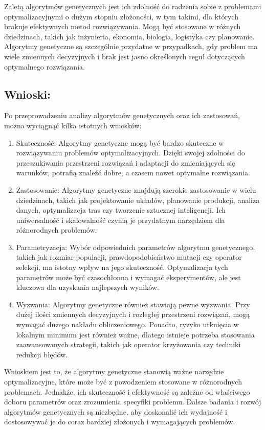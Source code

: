 \documentclass[11pt]{article}
\begin{document}
Zaletą algorytmów genetycznych jest ich zdolność do radzenia sobie z
problemami optymalizacyjnymi o dużym stopniu złożoności, w tym takimi,
dla których brakuje efektywnych metod rozwiązywania. Mogą być stosowane
w różnych dziedzinach, takich jak inżynieria, ekonomia, biologia,
logistyka czy planowanie. Algorytmy genetyczne są szczególnie przydatne
w przypadkach, gdy problem ma wiele zmiennych decyzyjnych i brak jest
jasno określonych reguł dotyczących optymalnego rozwiązania.

\hypertarget{wnioski}{%
\subsection{Wnioski:}\label{wnioski}}

Po przeprowadzeniu analizy algorytmów genetycznych oraz ich zastosowań,
można wyciągnąć kilka istotnych wniosków:

\begin{enumerate}
\def\labelenumi{\arabic{enumi}.}
\item
  Skuteczność: Algorytmy genetyczne mogą być bardzo skuteczne w
  rozwiązywaniu problemów optymalizacyjnych. Dzięki swojej zdolności do
  przeszukiwania przestrzeni rozwiązań i adaptacji do zmieniających się
  warunków, potrafią znaleźć dobre, a czasem nawet optymalne
  rozwiązania.
\item
  Zastosowanie: Algorytmy genetyczne znajdują szerokie zastosowanie w
  wielu dziedzinach, takich jak projektowanie układów, planowanie
  produkcji, analiza danych, optymalizacja tras czy tworzenie sztucznej
  inteligencji. Ich uniwersalność i skalowalność czynią je przydatnym
  narzędziem dla różnorodnych problemów.
\item
  Parametryzacja: Wybór odpowiednich parametrów algorytmu genetycznego,
  takich jak rozmiar populacji, prawdopodobieństwo mutacji czy operator
  selekcji, ma istotny wpływ na jego skuteczność. Optymalizacja tych
  parametrów może być czasochłonna i wymagać eksperymentów, ale jest
  kluczowa dla uzyskania najlepszych wyników.
\item
  Wyzwania: Algorytmy genetyczne również stawiają pewne wyzwania. Przy
  dużej ilości zmiennych decyzyjnych i rozległej przestrzeni rozwiązań,
  mogą wymagać dużego nakładu obliczeniowego. Ponadto, ryzyko utknięcia
  w lokalnym minimum jest również ważne, dlatego istnieje potrzeba
  stosowania zaawansowanych strategii, takich jak operator krzyżowania
  czy techniki redukcji błędów.
\end{enumerate}

Wnioskiem jest to, że algorytmy genetyczne stanowią ważne narzędzie
optymalizacyjne, które może być z powodzeniem stosowane w różnorodnych
problemach. Jednakże, ich skuteczność i efektywność są zależne od
właściwego doboru parametrów oraz zrozumienia specyfiki problemu. Dalsze
badania i rozwój algorytmów genetycznych są niezbędne, aby doskonalić
ich wydajność i dostosowywać je do coraz bardziej złożonych i
wymagających problemów.


    
    
    
\end{document}
